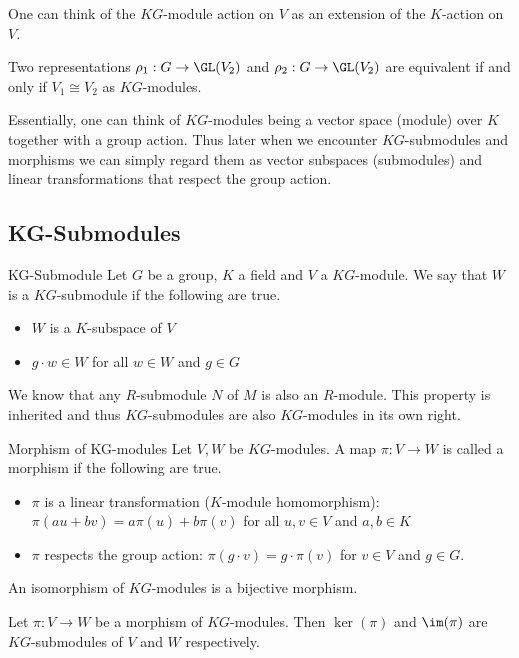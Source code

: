 \documentclass[a4paper]{article}
\begin{document}
One can think of the $KG$-module action on $V$ as an extension of the $K$-action on $V$. 

\begin{lmm}{}{} Two representations $\rho_1:G\to\GL(V_2)$ and $\rho_2:G\to\GL(V_2)$ are equivalent if and only if $V_1\cong V_2$ as $KG$-modules. 
\end{lmm}

Essentially, one can think of $KG$-modules being a vector space (module) over $K$ together with a group action. Thus later when we encounter $KG$-submodules and morphisms we can simply regard them as vector subspaces (submodules) and linear transformations that respect the group action. 

\subsection{KG-Submodules}
\begin{defn}{KG-Submodule}{} Let $G$ be a group, $K$ a field and $V$ a $KG$-module. We say that $W$ is a $KG$-submodule if the following are true. 
\begin{itemize}
\item $W$ is a $K$-subspace of $V$
\item $g\cdot w\in W$ for all $w\in W$ and $g\in G$
\end{itemize}
\end{defn}

We know that any $R$-submodule $N$ of $M$ is also an $R$-module. This property is inherited and thus $KG$-submodules are also $KG$-modules in its own right. 

\begin{defn}{Morphism of KG-modules}{} Let $V,W$ be $KG$-modules. A map $\pi:V\to W$ is called a morphism if the following are true. 
\begin{itemize}
\item $\pi$ is a linear transformation ($K$-module homomorphism): $\pi(au+bv)=a\pi(u)+b\pi(v)$ for all $u,v\in V$ and $a,b\in K$
\item $\pi$ respects the group action: $\pi(g\cdot v)=g\cdot\pi(v)$ for $v\in V$ and $g\in G$. 
\end{itemize}
An isomorphism of $KG$-modules is a bijective morphism. 
\end{defn}

\begin{lmm}{}{} Let $\pi:V\to W$ be a morphism of $KG$-modules. Then $\ker(\pi)$ and $\im(\pi)$ are $KG$-submodules of $V$ and $W$ respectively. 
\end{lmm}
\end{document}
